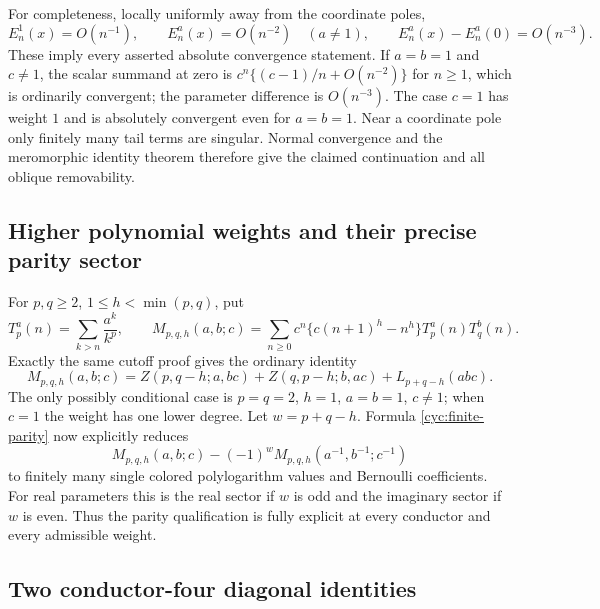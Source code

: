 For completeness, locally uniformly away from the coordinate poles,
\[
 E_n^1(x)=O(n^{-1}),\qquad E_n^a(x)=O(n^{-2})\quad(a\ne1),
 \qquad E_n^a(x)-E_n^a(0)=O(n^{-3}).
\]
These imply every asserted absolute convergence statement.  If
$a=b=1$ and $c\ne1$, the scalar summand at zero is
$c^n\{(c-1)/n+O(n^{-2})\}$ for $n\ge1$, which is ordinarily
convergent; the parameter difference is $O(n^{-3})$.  The case
$c=1$ has weight $1$ and is absolutely convergent even for $a=b=1$.
Near a coordinate pole only finitely many tail terms are singular.
Normal convergence and the meromorphic identity theorem therefore
give the claimed continuation and all oblique removability.

\subsection{Higher polynomial weights and their precise parity sector}

For $p,q\ge2$, $1\le h<\min(p,q)$, put
\[
 T_p^a(n)=\sum_{k>n}\frac{a^k}{k^p},\qquad
 M_{p,q,h}(a,b;c)=\sum_{n\ge0}c^n
       \{c(n+1)^h-n^h\}T_p^a(n)T_q^b(n).
\]
Exactly the same cutoff proof gives the ordinary identity
\begin{equation}\label{cyc:allweights}
 M_{p,q,h}(a,b;c)=Z(p,q-h;a,bc)+Z(q,p-h;b,ac)
                         +L_{p+q-h}(abc).
\end{equation}
The only possibly conditional case is $p=q=2$, $h=1$,
$a=b=1$, $c\ne1$; when $c=1$ the weight has one lower degree.
Let $w=p+q-h$.  Formula \eqref{cyc:finite-parity} now explicitly
reduces
\[
 M_{p,q,h}(a,b;c)-(-1)^w
 M_{p,q,h}(a^{-1},b^{-1};c^{-1})
\]
to finitely many single colored polylogarithm values and Bernoulli
coefficients.  For real parameters this is the real sector if $w$
is odd and the imaginary sector if $w$ is even.  Thus the parity
qualification is fully explicit at every conductor and every
admissible weight.

\subsection{Two conductor-four diagonal identities}

